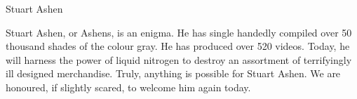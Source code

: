 {\Large Stuart Ashen}

\begin{figure}
	\vspace{-10mm}
	\vspace{-10mm}
\end{figure}

Stuart Ashen, or Ashens, is an enigma. He has single handedly compiled over 50 thousand shades of the colour gray. He has produced over 520 videos. Today, he will harness the power of liquid nitrogen to destroy an assortment of terrifyingly ill designed merchandise. Truly, anything is possible for Stuart Ashen. We are honoured, if slightly scared, to welcome him again today.